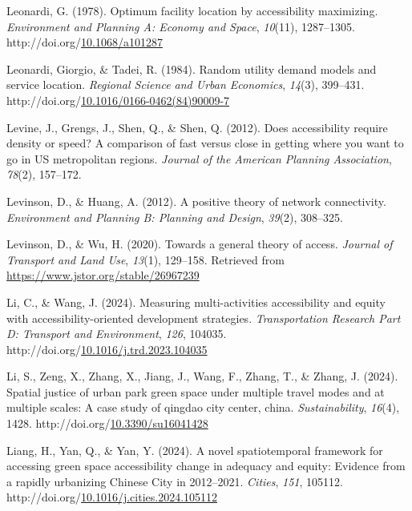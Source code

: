 \documentclass[
11pt, %
oneside, %
english, %
singlespacing, %
]{macthesis} %
\newlength{\cslhangindent}
\newenvironment{CSLReferences}[2] %
{\begin{list}{}{%
	\setlength{\itemindent}{0pt}
	\setlength{\leftmargin}{0pt}
	\setlength{\parsep}{0pt}
	\ifodd #1
	\setlength{\leftmargin}{\cslhangindent}
	\setlength{\itemindent}{-1\cslhangindent}
	\fi
	\setlength{\itemsep}{#2\baselineskip}}}
{\end{list}}
\begin{document}
\begin{CSLReferences}{1}{0}
Leonardi, G. (1978). Optimum facility location by accessibility maximizing. \emph{Environment and Planning A: Economy and Space}, \emph{10}(11), 1287--1305. http://doi.org/\href{https://doi.org/10.1068/a101287}{10.1068/a101287}

Leonardi, Giorgio, \& Tadei, R. (1984). Random utility demand models and service location. \emph{Regional Science and Urban Economics}, \emph{14}(3), 399--431. http://doi.org/\href{https://doi.org/10.1016/0166-0462(84)90009-7}{10.1016/0166-0462(84)90009-7}

Levine, J., Grengs, J., Shen, Q., \& Shen, Q. (2012). Does accessibility require density or speed? A comparison of fast versus close in getting where you want to go in US metropolitan regions. \emph{Journal of the American Planning Association}, \emph{78}(2), 157--172.

Levinson, D., \& Huang, A. (2012). A positive theory of network connectivity. \emph{Environment and Planning B: Planning and Design}, \emph{39}(2), 308--325.

Levinson, D., \& Wu, H. (2020). Towards a general theory of access. \emph{Journal of Transport and Land Use}, \emph{13}(1), 129--158. Retrieved from \url{https://www.jstor.org/stable/26967239}

Li, C., \& Wang, J. (2024). Measuring multi-activities accessibility and equity with accessibility-oriented development strategies. \emph{Transportation Research Part D: Transport and Environment}, \emph{126}, 104035. http://doi.org/\href{https://doi.org/10.1016/j.trd.2023.104035}{10.1016/j.trd.2023.104035}

Li, S., Zeng, X., Zhang, X., Jiang, J., Wang, F., Zhang, T., \& Zhang, J. (2024). Spatial justice of urban park green space under multiple travel modes and at multiple scales: A case study of qingdao city center, china. \emph{Sustainability}, \emph{16}(4), 1428. http://doi.org/\href{https://doi.org/10.3390/su16041428}{10.3390/su16041428}

Liang, H., Yan, Q., \& Yan, Y. (2024). A novel spatiotemporal framework for accessing green space accessibility change in adequacy and equity: {Evidence} from a rapidly urbanizing {Chinese} {City} in 2012--2021. \emph{Cities}, \emph{151}, 105112. http://doi.org/\href{https://doi.org/10.1016/j.cities.2024.105112}{10.1016/j.cities.2024.105112}


\end{CSLReferences}
\end{document}
